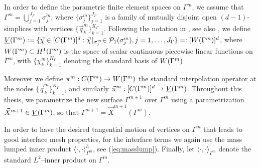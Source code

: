 In order to define the parametric finite element spaces on $\Gamma^m$, we
assume that $\Gamma^m=\bigcup_{j=1}^{J_\Gamma} \overline{\sigma^m_j}$, where
$\{\sigma^m_j\}_{j=1}^{J_\Gamma}$ is a family of mutually disjoint open
$(d-1)$-simplices with vertices $\{\vec{q}^m_k\}_{k=1}^{K_\Gamma}$. Following
the notation in \cite{spurious}, see also \cite{gflows3d}, we define
$\underline{V}(\Gamma^m) := \{\vec\chi \in [C(\Gamma^m)]^d:\vec\chi\!\mid_{\sigma^m_j}
\in \mathcal{P}_1(\sigma^m_j), j=1,\ldots, J_\Gamma\} =: [W(\Gamma^m)]^d$,
where $W(\Gamma^m) \subset H^1(\Gamma^m)$ is the space of scalar continuous
piecewise linear functions on $\Gamma^m$, with $\{\chi^m_k\}_{k=1}^{K_\Gamma}$
denoting the standard basis of $W(\Gamma^m)$.

Moreover we define $\pi^m: C(\Gamma^m)\to W(\Gamma^m)$ the standard interpolation
operator at the nodes $\{\vec{q}_k^m\}_{k=1}^{K_\Gamma}$, and similarly
$\vec\pi^m: [C(\Gamma^m)]^d\to \underline{V}(\Gamma^m)$. Throughout this thesis, we parametrize
the new surface $\Gamma^{m+1}$ over $\Gamma^m$ using a parametrization
$\vec{X}^{m+1} \in \underline{V}(\Gamma^m)$, so that $\Gamma^{m+1} = \vec{X}^{m+1}(\Gamma^m)$.

In order to have the desired tangential motion of vertices on $\Gamma^m$
that leads to good interface mesh properties, for the interface terms we again
use the mass lumped inner product $\langle\cdot,\cdot\rangle_{\Gamma^m}^h$, see
(\ref{eq:masslump}). Finally, let $\langle\cdot,\cdot\rangle_{\Gamma^m}$ denote
the standard $L^2$--inner product on $\Gamma^m$.

